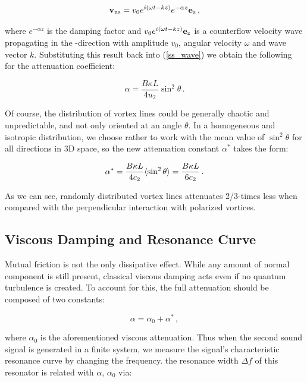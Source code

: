 \begin{equation}
\mathbf{v}_{\mathrm{ns}}
= v_0 e^{i(\omega t - kz)} e^{-\alpha z} \mathbf{e}_{\mathrm{z}}\,,
\end{equation}

where $e^{-\alpha z}$ is the damping factor and $v_0 e^{i(\omega t - kz)}\mathbf{e}_{\mathrm{z}}$ is a counterflow velocity wave propagating in the -direction with amplitude $v_0$, angular velocity $\omega$ and wave vector $k$. Substituting this result back into (\ref{ss_wave}) we obtain the following for the attenuation coefficient:

\begin{equation}
\alpha
= \frac{B\kappa L}{4 u_2} \sin^2 \theta\,.
\label{alpha}
\end{equation}

Of course, the distribution of vortex lines could be generally chaotic and unpredictable, and not only oriented at an angle $ \theta $. In a homogeneous and isotropic distribution, we choose rather to work with the mean value of $\sin^2{\theta}$ for all directions in 3D space, so the new attenuation constant $\alpha^*$ takes the form:

\begin{equation}
\alpha^*
= \frac{B\kappa L}{4 c_2} \langle \sin^2 \theta \rangle
= \frac{B\kappa L}{6 c_2}
\label{alpha_mean}\,.
\end{equation}

As we can see, randomly distributed vortex lines attenuates 2/3-times less when compared with the perpendicular interaction with polarized vortices.


\subsection*{Viscous Damping and Resonance Curve}

Mutual friction is not the only dissipative effect. While any amount of normal component is still present, classical viscous damping acts
even if no quantum turbulence is created. To account for this, the full attenuation should be composed of two constants:

\begin{equation}
\alpha = \alpha_0 + \alpha^*\,,
\label{attenuation}
\end{equation}

where $\alpha_0$ is the aforementioned viscous attenuation. Thus when the second sound signal is generated in a finite system, we measure the signal's characteristic resonance curve by changing the frequency. the resonance width $\Delta f$ of this resonator is related with $ \alpha $, $ \alpha_0 $ via:

